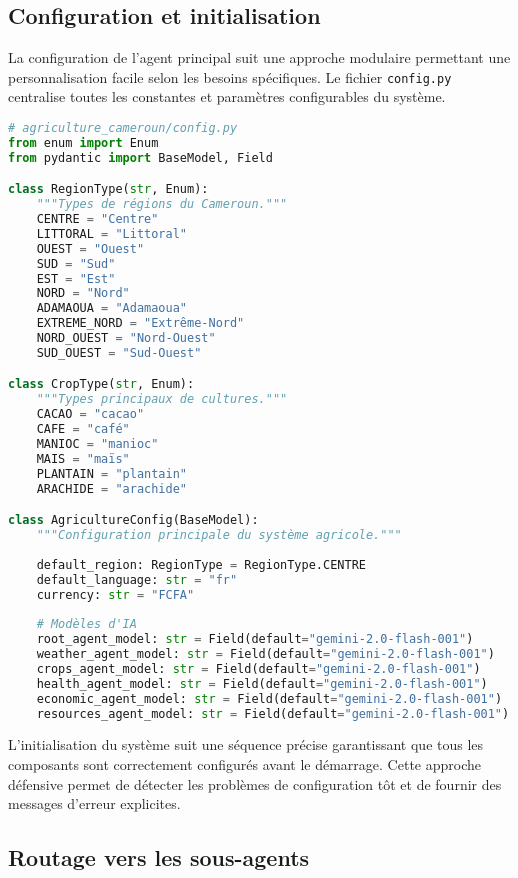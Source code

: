 \subsection{Configuration et initialisation}

La configuration de l'agent principal suit une approche modulaire permettant une personnalisation facile selon les besoins spécifiques. Le fichier \texttt{config.py} centralise toutes les constantes et paramètres configurables du système.

 
\begin{lstlisting}[language=Python, caption=Configuration du système]
# agriculture_cameroun/config.py
from enum import Enum
from pydantic import BaseModel, Field

class RegionType(str, Enum):
    """Types de régions du Cameroun."""
    CENTRE = "Centre"
    LITTORAL = "Littoral"
    OUEST = "Ouest"
    SUD = "Sud"
    EST = "Est"
    NORD = "Nord"
    ADAMAOUA = "Adamaoua"
    EXTREME_NORD = "Extrême-Nord"
    NORD_OUEST = "Nord-Ouest"
    SUD_OUEST = "Sud-Ouest"

class CropType(str, Enum):
    """Types principaux de cultures."""
    CACAO = "cacao"
    CAFE = "café"
    MANIOC = "manioc"
    MAIS = "maïs"
    PLANTAIN = "plantain"
    ARACHIDE = "arachide"

class AgricultureConfig(BaseModel):
    """Configuration principale du système agricole."""
    
    default_region: RegionType = RegionType.CENTRE
    default_language: str = "fr"
    currency: str = "FCFA"
    
    # Modèles d'IA
    root_agent_model: str = Field(default="gemini-2.0-flash-001")
    weather_agent_model: str = Field(default="gemini-2.0-flash-001")
    crops_agent_model: str = Field(default="gemini-2.0-flash-001")
    health_agent_model: str = Field(default="gemini-2.0-flash-001")
    economic_agent_model: str = Field(default="gemini-2.0-flash-001")
    resources_agent_model: str = Field(default="gemini-2.0-flash-001")
\end{lstlisting}

L'initialisation du système suit une séquence précise garantissant que tous les composants sont correctement configurés avant le démarrage. Cette approche défensive permet de détecter les problèmes de configuration tôt et de fournir des messages d'erreur explicites.

\subsection{Routage vers les sous-agents}

